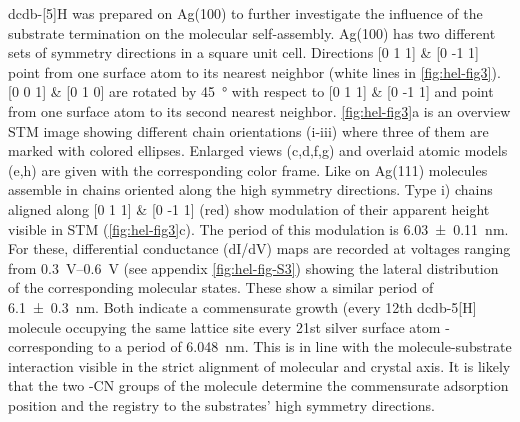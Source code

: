 dcdb-[5]H was prepared on Ag(100) to further investigate the influence of the substrate termination on the molecular self-assembly. Ag(100) has two different sets of symmetry directions in a square unit cell. Directions [0 1 1] \& [0 -1 1] point from one surface atom to its nearest neighbor (white lines in \autoref{fig:hel-fig3}). [0 0 1] \& [0 1 0] are rotated by \SI{45}{\degree} with respect to [0 1 1] \& [0 -1 1] and point from one surface atom to its second nearest neighbor. \autoref{fig:hel-fig3}a is an overview STM image showing different chain orientations (i-iii) where three of them are marked with colored ellipses. Enlarged views (c,d,f,g) and overlaid atomic models (e,h) are given with the corresponding color frame. Like on Ag(111) molecules assemble in chains oriented along the high symmetry directions. Type i) chains aligned along [0 1 1] \& [0 -1 1] (red) show modulation of their apparent height visible in STM (\autoref{fig:hel-fig3}c). The period of this modulation is \SI{6.03 \pm 0.11}{\nano \meter}. For these, differential conductance (dI/dV) maps are recorded at voltages ranging from \SIrange{0.3}{0,6}{\volt} (see appendix \autoref{fig:hel-fig-S3}) showing the lateral distribution of the corresponding molecular states. These show a similar period of \SI{6.1 \pm 0.3}{\nano \meter}. Both indicate a commensurate growth (every 12th dcdb-5[H] molecule occupying the same lattice site every 21st silver surface atom - corresponding to a period of \SI{6.048}{\nano \meter}. This is in line with the molecule-substrate interaction visible in the strict alignment of molecular and crystal axis. It is likely that the two -CN groups of the molecule determine the commensurate adsorption position and the registry to the substrates’ high symmetry directions. 

